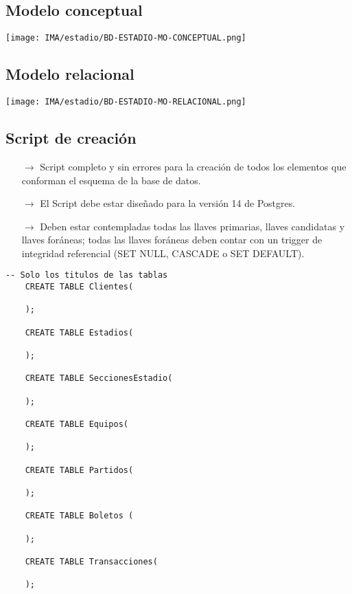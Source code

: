 \subsection{Modelo conceptual}
\begin{center}
    \texttt{[image: IMA/estadio/BD-ESTADIO-MO-CONCEPTUAL.png]}
\end{center}


\subsection{Modelo relacional}
\begin{center}
    \texttt{[image: IMA/estadio/BD-ESTADIO-MO-RELACIONAL.png]}
\end{center}


\subsection{Script de creación}

\begin{itemize}
    \item[$\rightarrow$] Script completo y sin errores para la creación de todos los elementos que conforman el esquema
            de la base de datos.
    \item[$\rightarrow$] El Script debe estar diseñado para la versión 14 de Postgres.
    \item[$\rightarrow$] Deben estar contempladas todas las llaves primarias, llaves candidatas y llaves foráneas;
    todas las llaves foráneas deben contar con un trigger de integridad referencial (SET NULL,
    CASCADE o SET DEFAULT).
\end{itemize}


\begin{lstlisting}[caption={Tablas para la BdDatos}, label={lst:sql_estadios}]
    -- Solo los titulos de las tablas    
    CREATE TABLE Clientes(

    );

    CREATE TABLE Estadios(

    );

    CREATE TABLE SeccionesEstadio(

    );

    CREATE TABLE Equipos(

    );

    CREATE TABLE Partidos(

    );

    CREATE TABLE Boletos (

    );

    CREATE TABLE Transacciones(

    );
\end{lstlisting}

